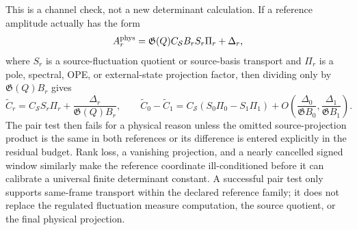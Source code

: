 \begin{controlledapproximation}
This is a channel check, not a new determinant calculation.  If a reference
amplitude actually has the form
\begin{equation}
  A_r^{\rm phys}
  =
  \mathfrak G(Q)C_{\mathcal S}B_rS_r\Pi_r+\Delta_r,
  \label{eq:instanton-reference-omitted-source-projection}
\end{equation}
where \(S_r\) is a source-fluctuation quotient or source-basis transport and
\(\Pi_r\) is a pole, spectral, OPE, or external-state projection factor, then
dividing only by \(\mathfrak G(Q)B_r\) gives
\begin{equation}
  \widetilde C_r
  =
  C_{\mathcal S}S_r\Pi_r
  +
  \frac{\Delta_r}{\mathfrak G(Q)B_r},
  \qquad
  \widetilde C_0-\widetilde C_1
  =
  C_{\mathcal S}(S_0\Pi_0-S_1\Pi_1)
  +
  O\!\left(\frac{\Delta_0}{\mathfrak G B_0},
           \frac{\Delta_1}{\mathfrak G B_1}\right).
  \label{eq:instanton-reference-omitted-factor-drift}
\end{equation}
The pair test then fails for a physical reason unless the omitted
source-projection product is the same in both references or its difference is
entered explicitly in the residual budget.  Rank loss, a vanishing projection,
and a nearly cancelled signed window similarly make the reference coordinate
ill-conditioned before it can calibrate a universal finite determinant
constant.  A successful pair test only supports same-frame transport within
the declared reference family; it does not replace the regulated fluctuation
measure computation, the source quotient, or the final physical projection.
\end{controlledapproximation}

